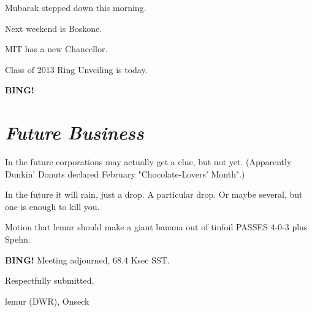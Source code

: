 \documentclass[10pt]{article}
\newcommand{\bing}{{\bf BING!} }
\newcommand{\goto}[1]{\bing \vskip 12pt \section*{{\em{#1}}}}
\newcommand{\ps}{ plus Spehn\xspace}
\newcommand{\onseck}{lemur (DWR), Onseck}
\begin{document}
Mubarak stepped down this morning.

Next weekend is Boskone.

MIT has a new Chancellor.

Class of 2013 Ring Unveiling is today.


\goto{Future Business}

In the future corporations may actually get a clue, but not yet.
(Apparently Dunkin' Donuts declared February "Chocolate-Lovers'
Month".)

In the future it will rain, just a drop.  A particular drop.
Or maybe several, but one is enough to kill you.

Motion that lemur should make a giant banana out of tinfoil
PASSES 4-0-3\ps.

\bing
\noindent
Meeting adjourned, 68.4 Ksec SST.

\vspace{18pt}

\centerline{Respectfully submitted,}
\centerline{\onseck}
\end{document}
